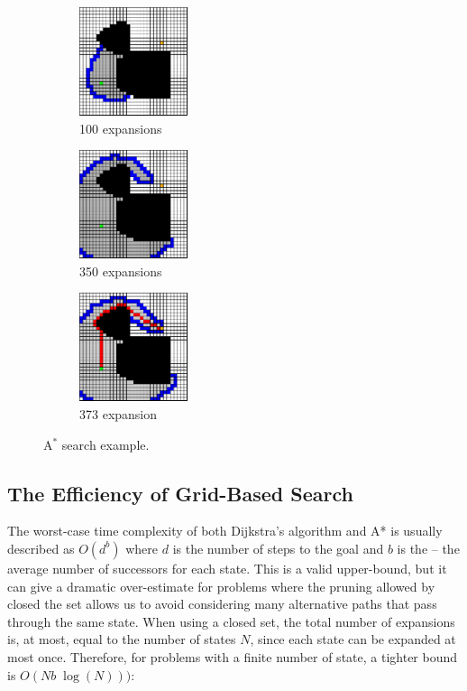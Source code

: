 \begin{figure}
\begin{center}
    \begin{subfigure}[t]{0.3\textwidth}
      \includegraphics[width=1.25in]{planning/figs/astar_0100.pdf}
       \caption{100 expansions}
    \end{subfigure}
    \begin{subfigure}[t]{0.3\textwidth}
      \includegraphics[width=1.25in]{planning/figs/astar_0350.pdf}
       \caption{350 expansions}
    \end{subfigure}
    \begin{subfigure}[t]{0.3\textwidth}
      \includegraphics[width=1.25in]{planning/figs/astar_0373.pdf}
       \caption{373 expansion}
    \end{subfigure}


\end{center}
\caption{A$^*$ search example.}
\label{fig:astar}
\end{figure}

\subsection{The Efficiency of Grid-Based Search}

The worst-case time complexity of both Dijkstra's algorithm and A* is
usually described as $O(d^b)$ where $d$ is the number of steps to the
goal and $b$ is the  -- the average number of
successors for each state.  This is a valid upper-bound, but it can
give a dramatic over-estimate for problems where the pruning allowed
by closed the set allows us to avoid considering many alternative
paths that pass through the same state.  When using a closed set, the
total number of expansions is, at most, equal to the number of states
$N$, since each state can be expanded at most once.  Therefore, for
problems with a finite number of state, a tighter bound is $O(Nb \;
\log(N)))$:


